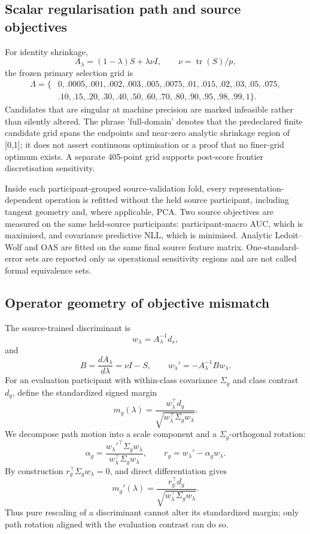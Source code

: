 \subsection{Scalar regularisation path and source objectives}
For identity shrinkage,
\[
 A_\lambda=(1-\lambda)S+\lambda\nu I,
 \qquad
 \nu=\operatorname{tr}(S)/p,
\]
the frozen primary selection grid is
\[
\begin{aligned}
\Lambda=\{&
0,.0005,.001,.002,.003,.005,.0075,.01,.015,.02,.03,.05,.075,\\
&.10,.15,.20,.30,.40,.50,.60,.70,.80,.90,.95,.98,.99,1
\}.
\end{aligned}
\]
Candidates that are singular at machine precision are marked infeasible
rather than silently altered. The phrase 'full-domain' denotes that the
predeclared finite candidate grid spans the endpoints and near-zero analytic
shrinkage region of [0,1]; it does not assert continuous optimisation or a
proof that no finer-grid optimum exists. A separate 405-point grid supports
post-score frontier discretisation sensitivity.

Inside each participant-grouped source-validation fold, every
representation-dependent operation is refitted without the held source
participant, including tangent geometry and, where applicable, PCA. Two
source objectives are measured on the same held-source participants:
participant-macro AUC, which is maximised, and covariance predictive NLL,
which is minimised. Analytic Ledoit--Wolf and OAS are fitted on the same final
source feature matrix. One-standard-error sets are reported only as
operational sensitivity regions and are not called formal equivalence sets.

\subsection{Operator geometry of objective mismatch}
The source-trained discriminant is
\[
 w_\lambda=A_\lambda^{-1}d_s,
\]
and
\[
 B=\frac{dA_\lambda}{d\lambda}=\nu I-S,
 \qquad
 w_\lambda'=-A_\lambda^{-1}Bw_\lambda.
\]
For an evaluation participant with within-class covariance \(\Sigma_g\)
and class contrast \(d_g\), define the standardized signed margin
\[
 m_g(\lambda)=
 \frac{w_\lambda^\top d_g}
 {\sqrt{w_\lambda^\top\Sigma_gw_\lambda}}.
\]
We decompose path motion into a scale component and a
\(\Sigma_g\)-orthogonal rotation:
\[
 \alpha_g=
 \frac{w_\lambda'^\top\Sigma_gw_\lambda}
 {w_\lambda^\top\Sigma_gw_\lambda},
 \qquad
 r_g=w_\lambda'-\alpha_gw_\lambda.
\]
By construction \(r_g^\top\Sigma_gw_\lambda=0\), and direct
differentiation gives
\[
 m_g'(\lambda)=
 \frac{r_g^\top d_g}
 {\sqrt{w_\lambda^\top\Sigma_gw_\lambda}}.
\]
Thus pure rescaling of a discriminant cannot alter its standardized margin;
only path rotation aligned with the evaluation contrast can do so.

